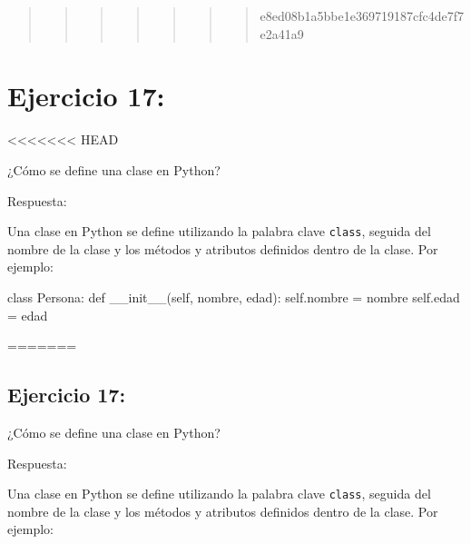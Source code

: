 \documentclass[
  a4paper,
  DIV=11,
  numbers=noendperiod,
  onepage,
  openany]{scrreprt}
\newenvironment{Shaded}{\begin{snugshade}}{\end{snugshade}}
\newcommand{\FunctionTok}[1]{\textcolor[rgb]{0.28,0.35,0.67}{#1}}
\newcommand{\KeywordTok}[1]{\textcolor[rgb]{0.00,0.23,0.31}{#1}}
\newcommand{\NormalTok}[1]{\textcolor[rgb]{0.00,0.23,0.31}{#1}}
\newcommand{\OperatorTok}[1]{\textcolor[rgb]{0.37,0.37,0.37}{#1}}
\newcommand{\VariableTok}[1]{\textcolor[rgb]{0.07,0.07,0.07}{#1}}
\begin{document}
\begin{quote}
\begin{quote}
\begin{quote}
\begin{quote}
\begin{quote}
\begin{quote}
\begin{quote}
e8ed08b1a5bbe1e369719187cfc4de7f7e2a41a9
\end{quote}
\end{quote}
\end{quote}
\end{quote}
\end{quote}
\end{quote}
\end{quote}

\hypertarget{ejercicio-17}{%
\chapter{Ejercicio 17:}\label{ejercicio-17}}

\textless\textless\textless\textless\textless\textless\textless{} HEAD

¿Cómo se define una clase en Python?

Respuesta:

Una clase en Python se define utilizando la palabra clave
\texttt{class}, seguida del nombre de la clase y los métodos y atributos
definidos dentro de la clase. Por ejemplo:

\begin{Shaded}
\begin{Highlighting}[]
\KeywordTok{class}\NormalTok{ Persona:}
    \KeywordTok{def} \FunctionTok{\_\_init\_\_}\NormalTok{(}\VariableTok{self}\NormalTok{, nombre, edad):}
        \VariableTok{self}\NormalTok{.nombre }\OperatorTok{=}\NormalTok{ nombre}
        \VariableTok{self}\NormalTok{.edad }\OperatorTok{=}\NormalTok{ edad}
\end{Highlighting}
\end{Shaded}

=======

\hypertarget{ejercicio-17-1}{%
\section{Ejercicio 17:}\label{ejercicio-17-1}}

¿Cómo se define una clase en Python?

Respuesta:

Una clase en Python se define utilizando la palabra clave
\texttt{class}, seguida del nombre de la clase y los métodos y atributos
definidos dentro de la clase. Por ejemplo:
\end{document}
